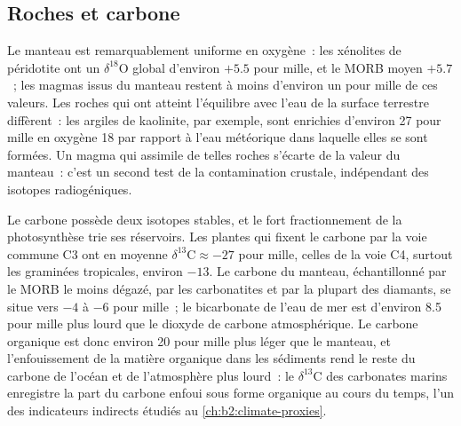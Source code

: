 \subsection{Roches et carbone}

Le manteau est remarquablement uniforme en oxygène~: les xénolites de péridotite ont un
$\delta^{18}\mathrm{O}$ global d'environ $+5.5$ pour mille, et le MORB moyen $+5.7$~; les magmas
issus du manteau restent à moins d'environ un pour mille de ces valeurs. Les roches qui ont atteint
l'équilibre avec l'eau de la surface terrestre diffèrent~: les argiles de kaolinite, par
exemple, sont enrichies d'environ 27 pour mille en oxygène 18 par rapport à l'eau météorique dans laquelle
elles se sont formées. Un magma qui assimile de telles roches s'écarte de la valeur
du manteau~: c'est un second test de la contamination crustale, indépendant des isotopes
radiogéniques.

Le carbone possède deux isotopes stables, et le fort fractionnement de la photosynthèse
trie ses réservoirs. Les plantes qui fixent le carbone par la voie commune C3 ont en moyenne
$\delta^{13}\mathrm{C} \approx -27$ pour mille, celles de la voie C4, surtout les graminées tropicales,
environ $-13$. Le carbone du manteau, échantillonné par le MORB le moins dégazé, par les
carbonatites et par la plupart des diamants, se situe vers $-4$ à $-6$ pour mille~; le
bicarbonate de l'eau de mer est d'environ 8.5 pour mille plus lourd que le dioxyde de carbone
atmosphérique. Le carbone organique est donc environ 20 pour mille plus léger que le manteau, et
l'enfouissement de la matière organique dans les sédiments rend le reste du carbone de l'océan et
de l'atmosphère plus lourd~: le $\delta^{13}\mathrm{C}$ des carbonates marins
enregistre la part du carbone enfoui sous forme organique au cours du temps, l'un des
indicateurs indirects étudiés au \cref{ch:b2:climate-proxies}.

\begin{omfigure}
\centering
{}
\par{}
\end{omfigure}

